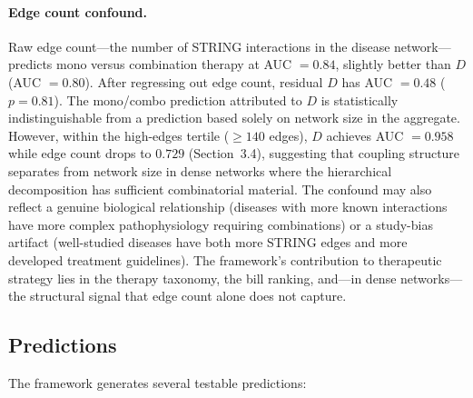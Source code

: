 \documentclass[11pt,a4paper]{article}
\begin{document}
\paragraph{Edge count confound.} Raw edge count---the number of STRING interactions in the disease network---predicts mono versus combination therapy at AUC $= 0.84$, slightly better than $D$ (AUC $= 0.80$). After regressing out edge count, residual $D$ has AUC $= 0.48$ ($p = 0.81$). The mono/combo prediction attributed to $D$ is statistically indistinguishable from a prediction based solely on network size in the aggregate. However, within the high-edges tertile ($\geq 140$ edges), $D$ achieves AUC $= 0.958$ while edge count drops to $0.729$ (Section~3.4), suggesting that coupling structure separates from network size in dense networks where the hierarchical decomposition has sufficient combinatorial material. The confound may also reflect a genuine biological relationship (diseases with more known interactions have more complex pathophysiology requiring combinations) or a study-bias artifact (well-studied diseases have both more STRING edges and more developed treatment guidelines). The framework's contribution to therapeutic strategy lies in the therapy taxonomy, the bill ranking, and---in dense networks---the structural signal that edge count alone does not capture.

\subsection{Predictions}

The framework generates several testable predictions:
\end{document}
